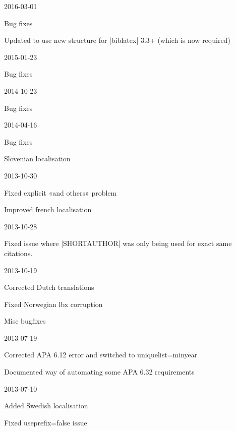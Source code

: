 \documentclass{ltxdockit}
\begin{document}
\begin{changelog}
\begin{release}{6.8}{2016-03-01}
\item Bug fixes
\item Updated to use new  structure for |biblatex|
  3.3+ (which is now required)
\end{release}

\begin{release}{6.7}{2015-01-23}
\item Bug fixes
\end{release}

\begin{release}{6.6}{2014-10-23}
\item Bug fixes
\end{release}

\begin{release}{6.5}{2014-04-16}
\item Bug fixes
\item Slovenian localisation
\end{release}

\begin{release}{6.4}{2013-10-30}
\item Fixed explicit «and others» problem
\item Improved french localisation
\end{release}

\begin{release}{6.3}{2013-10-28}
\item Fixed issue where |SHORTAUTHOR| was only being used for exact same citations.
\end{release}

\begin{release}{6.2}{2013-10-19}
\item Corrected Dutch translations
\item Fixed Norwegian lbx corruption
\item Misc bugfixes
\end{release}

\begin{release}{6.1}{2013-07-19}
\item Corrected APA 6.12 error and switched to uniquelist=minyear
\item Documented way of automating some APA 6.32 requirements
\end{release}

\begin{release}{6.0}{2013-07-10}
\item Added Swedish localisation
\item Fixed useprefix=false issue
\end{release}


\end{changelog}
\end{document}

